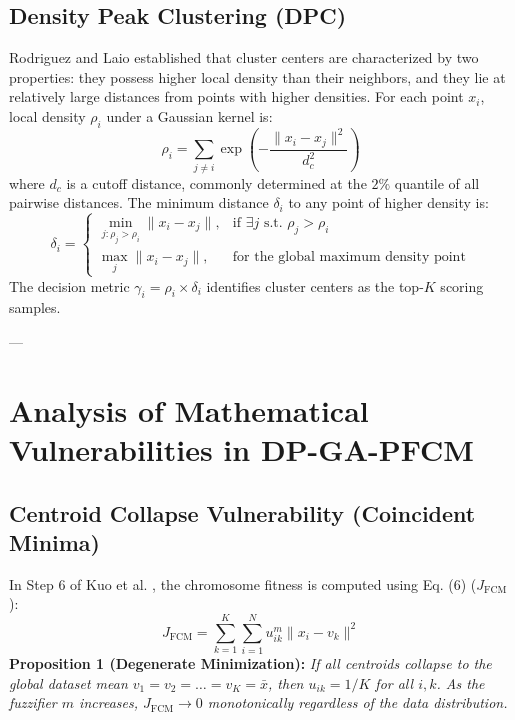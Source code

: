 \documentclass[preprint,12pt]{elsarticle}
\begin{document}
\subsection{Density Peak Clustering (DPC)}
Rodriguez and Laio \cite{rodriguez2014clustering} established that cluster centers are characterized by two properties: they possess higher local density than their neighbors, and they lie at relatively large distances from points with higher densities. For each point $x_i$, local density $\rho_i$ under a Gaussian kernel is:
\begin{equation}
\rho_i = \sum_{j \neq i} \exp\left( - \frac{\|x_i - x_j\|^2}{d_c^2} \right)
\label{eq:rho}
\end{equation}
where $d_c$ is a cutoff distance, commonly determined at the $2\%$ quantile of all pairwise distances. The minimum distance $\delta_i$ to any point of higher density is:
\begin{equation}
\delta_i = \begin{cases}
\min_{j: \rho_j > \rho_i} \|x_i - x_j\|, & \text{if } \exists j \text{ s.t. } \rho_j > \rho_i \\
\max_j \|x_i - x_j\|, & \text{for the global maximum density point}
\end{cases}
\label{eq:delta}
\end{equation}
The decision metric $\gamma_i = \rho_i \times \delta_i$ identifies cluster centers as the top-$K$ scoring samples.

---

\section{Analysis of Mathematical Vulnerabilities in DP-GA-PFCM}
\label{sec:vulnerabilities}

\subsection{Centroid Collapse Vulnerability (Coincident Minima)}
In Step 6 of Kuo et al. \cite{kuo2023density}, the chromosome fitness is computed using Eq. (6) ($J_{\text{FCM}}$):
\begin{equation}
J_{\text{FCM}} = \sum_{k=1}^K \sum_{i=1}^N u_{ik}^m \|x_i - v_k\|^2
\label{eq:fcm_collapse}
\end{equation}
\textbf{Proposition 1 (Degenerate Minimization):} \textit{If all centroids collapse to the global dataset mean $v_1 = v_2 = \dots = v_K = \bar{x}$, then $u_{ik} = 1/K$ for all $i, k$. As the fuzzifier $m$ increases, $J_{\text{FCM}} \to 0$ monotonically regardless of the data distribution.}
\end{document}
